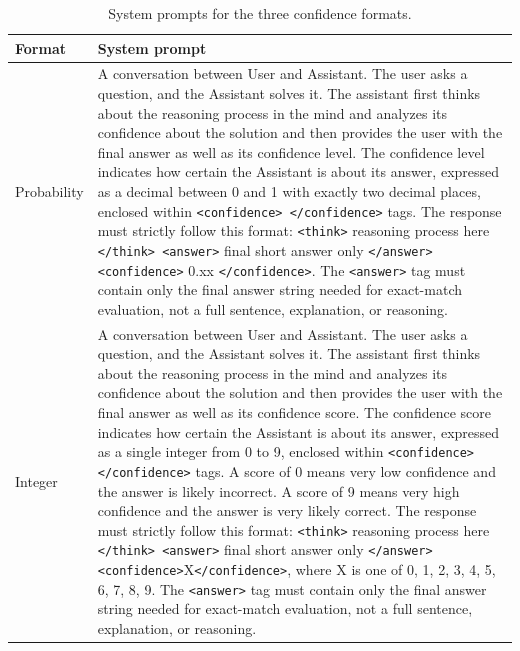 \begin{table}[t]
    \centering
    \caption{System prompts for the three confidence formats.}
    \label{tab:format_prompts}
    \small
    \begin{tabularx}{\linewidth}{lX}
        \toprule
        Format & System prompt \\
        \midrule
        Probability &
        A conversation between User and Assistant. The user asks a question, and
        the Assistant solves it. The assistant first thinks about the reasoning
        process in the mind and analyzes its confidence about the solution and
        then provides the user with the final answer as well as its confidence
        level. The confidence level indicates how certain the Assistant is about
        its answer, expressed as a decimal between 0 and 1 with exactly two
        decimal places, enclosed within \texttt{<confidence> </confidence>} tags.
        The response must strictly follow this format: \texttt{<think>} reasoning
        process here \texttt{</think> <answer>} final short answer only
        \texttt{</answer> <confidence>} 0.xx \texttt{</confidence>}. The
        \texttt{<answer>} tag must contain only the final answer string needed for
        exact-match evaluation, not a full sentence, explanation, or reasoning. \\
        \midrule
        Integer &
        A conversation between User and Assistant. The user asks a question, and
        the Assistant solves it. The assistant first thinks about the reasoning
        process in the mind and analyzes its confidence about the solution and
        then provides the user with the final answer as well as its confidence
        score. The confidence score indicates how certain the Assistant is about
        its answer, expressed as a single integer from 0 to 9, enclosed within
        \texttt{<confidence> </confidence>} tags. A score of 0 means very low
        confidence and the answer is likely incorrect. A score of 9 means very
        high confidence and the answer is very likely correct. The response must
        strictly follow this format: \texttt{<think>} reasoning process here
        \texttt{</think> <answer>} final short answer only
        \texttt{</answer> <confidence>}X\texttt{</confidence>}, where X is one of
        0, 1, 2, 3, 4, 5, 6, 7, 8, 9. The \texttt{<answer>} tag must contain only
        the final answer string needed for exact-match evaluation, not a full
        sentence, explanation, or reasoning. \\
        \midrule

\end{tabularx}
\end{table}
